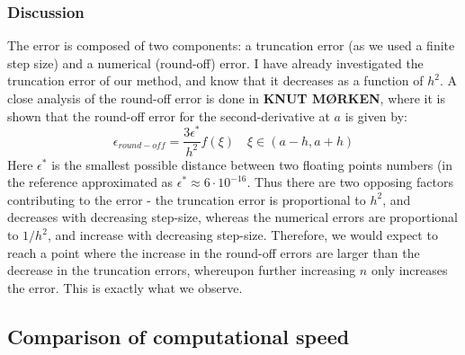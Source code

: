 \documentclass[a4paper, 10pt]{article}
\begin{document}
\subsubsection{Discussion}
The error is composed of two components: a truncation error (as we used a finite step size) and a numerical (round-off) error. I have already investigated the truncation error of our method, and know that it decreases as a function of $h^2$. A close analysis of the round-off error is done in \textbf{KNUT MØRKEN}, where it is shown that the round-off error for the second-derivative at $a$ is given by:
\begin{equation}
\epsilon_{round-off} = \frac{3\epsilon^*}{h^2}f(\xi) \quad \xi \in (a-h, a+h)
\end{equation}
Here $\epsilon^*$ is the smallest possible distance between two floating points numbers (in the reference approximated as $\epsilon^* \approx 6\cdot 10^{-16}$. Thus there are two opposing factors contributing to the error - the truncation error is proportional to $h^2$, and decreases with decreasing step-size, whereas the numerical errors are proportional to $1/h^2$, and increase with decreasing step-size. Therefore, we would expect to reach a point where the increase in the round-off errors are larger than the decrease in the truncation errors, whereupon further increasing $n$ only increases the error. This is exactly what we observe.
\subsection{Comparison of computational speed}
\end{document}
